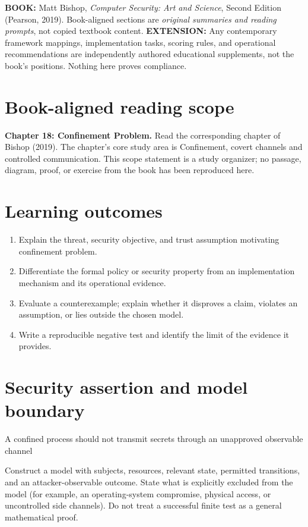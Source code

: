 \documentclass[10pt,letterpaper]{article}
\begin{document}
\makedoctocpage
\begin{notebox}
\textbf{BOOK:} Matt Bishop, \emph{Computer Security: Art and Science}, Second Edition (Pearson, 2019). Book-aligned sections are \emph{original summaries and reading prompts}, not copied textbook content.
\textbf{EXTENSION:} Any contemporary framework mappings, implementation tasks, scoring rules, and operational recommendations are independently authored educational supplements, not the book's positions. Nothing here proves compliance.
\end{notebox}
\section{Book-aligned reading scope}
\textbf{Chapter 18: Confinement Problem.} Read the corresponding chapter of Bishop (2019). The chapter's core study area is Confinement, covert channels and controlled communication. This scope statement is a study organizer; no passage, diagram, proof, or exercise from the book has been reproduced here.
\section{Learning outcomes}
\begin{enumerate}
\item Explain the threat, security objective, and trust assumption motivating confinement problem.
\item Differentiate the formal policy or security property from an implementation mechanism and its operational evidence.
\item Evaluate a counterexample; explain whether it disproves a claim, violates an assumption, or lies outside the chosen model.
\item Write a reproducible negative test and identify the limit of the evidence it provides.
\end{enumerate}
\section{Security assertion and model boundary}
\begin{infobox}
A confined process should not transmit secrets through an unapproved observable channel
\end{infobox}
Construct a model with subjects, resources, relevant state, permitted transitions, and an attacker-observable outcome. State what is explicitly excluded from the model (for example, an operating-system compromise, physical access, or uncontrolled side channels). Do not treat a successful finite test as a general mathematical proof.
\end{document}
